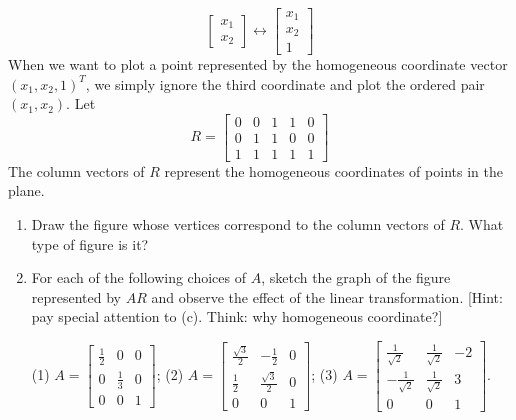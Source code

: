 \documentclass[a4paper,11pt]{article}
\begin{document}
\begin{enumerate}
\[ \begin{bmatrix}
      x_1 \\ x_2
\end{bmatrix} \leftrightarrow \begin{bmatrix}
      x_1 \\ x_2 \\ 1
\end{bmatrix}\]
When we want to plot a point represented by the homogeneous coordinate vector
$(x_1, x_2, 1)^T$, we simply ignore the third coordinate and plot the ordered pair $(x_1, x_2)$.
Let \[R = \begin{bmatrix}
      0 & 0 & 1 & 1 & 0\\
      0 & 1 & 1 & 0 & 0\\
      1 & 1 & 1 & 1 & 1
\end{bmatrix}\] The column vectors of $R$ represent the homogeneous coordinates of points in the plane.
\begin{enumerate}
      \item Draw the figure whose vertices correspond to
the column vectors of $R$. What type of figure is it?
      \item For each of the following choices of $A$, sketch
      the graph of the figure represented by $AR$ and
      observe the effect of the linear
      transformation. [Hint: pay special attention to (c). Think: why homogeneous coordinate?]

      (1) $A = \begin{bmatrix}
                  \frac12 & 0 & 0 \\ 0 & \frac13 & 0\\ 0 & 0 & 1
            \end{bmatrix}$;\quad 
      (2) $A = \begin{bmatrix}
                  \frac{\sqrt3}{2} & -\frac1{2} & 0 \\ \frac1{2} & \frac{\sqrt3}{2} & 0\\ 0 & 0 & 1
            \end{bmatrix}$;\quad 
      (3) $A = \begin{bmatrix}
                  \frac1{\sqrt2} & \frac1{\sqrt2} & -2 \\ -\frac1{\sqrt2} & \frac1{\sqrt2} & 3\\ 0 & 0 & 1
            \end{bmatrix}$. 
\end{enumerate}


\end{enumerate}
\end{document}
